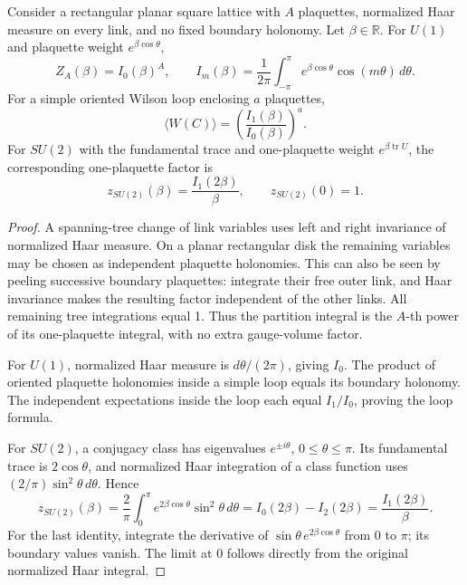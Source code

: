 \begin{proposition}\leavevmode\par\noindent\ours\quad
Consider a rectangular planar square lattice with \(A\) plaquettes, normalized Haar measure on every link, and no fixed boundary holonomy. Let \(\beta\in\mathbb R\). For \(U(1)\) and plaquette weight \(e^{\beta\cos\theta}\),
\[
 Z_A(\beta)=I_0(\beta)^A,
 \qquad
 I_m(\beta)=\frac1{2\pi}\int_{-\pi}^{\pi}
       e^{\beta\cos\theta}\cos(m\theta)\,d\theta.
\]
For a simple oriented Wilson loop enclosing \(a\) plaquettes,
\[
 \langle W(C)\rangle=
    \left(\frac{I_1(\beta)}{I_0(\beta)}\right)^a.
\]
For \(SU(2)\) with the fundamental trace and one-plaquette weight
\(e^{\beta\operatorname{tr}U}\), the corresponding one-plaquette factor is
\[
 z_{SU(2)}(\beta)=\frac{I_1(2\beta)}{\beta},
 \qquad z_{SU(2)}(0)=1.
\]
\end{proposition}
\begin{proof}
A spanning-tree change of link variables uses left and right invariance of normalized Haar measure. On a planar rectangular disk the remaining variables may be chosen as independent plaquette holonomies. This can also be seen by peeling successive boundary plaquettes: integrate their free outer link, and Haar invariance makes the resulting factor independent of the other links. All remaining tree integrations equal 1. Thus the partition integral is the \(A\)-th power of its one-plaquette integral, with no extra gauge-volume factor.

For \(U(1)\), normalized Haar measure is \(d\theta/(2\pi)\), giving \(I_0\). The product of oriented plaquette holonomies inside a simple loop equals its boundary holonomy. The independent expectations inside the loop each equal \(I_1/I_0\), proving the loop formula.

For \(SU(2)\), a conjugacy class has eigenvalues \(e^{\pm i\theta}\), \(0\le\theta\le\pi\). Its fundamental trace is \(2\cos\theta\), and normalized Haar integration of a class function uses \((2/\pi)\sin^2\theta\,d\theta\). Hence
\[
 z_{SU(2)}(\beta)
 =\frac2\pi\int_0^\pi e^{2\beta\cos\theta}\sin^2\theta\,d\theta
 =I_0(2\beta)-I_2(2\beta)
 =\frac{I_1(2\beta)}{\beta}.
\]
For the last identity, integrate the derivative of
\(\sin\theta\,e^{2\beta\cos\theta}\) from 0 to \(\pi\); its boundary values vanish. The limit at 0 follows directly from the original normalized Haar integral.
\end{proof}


